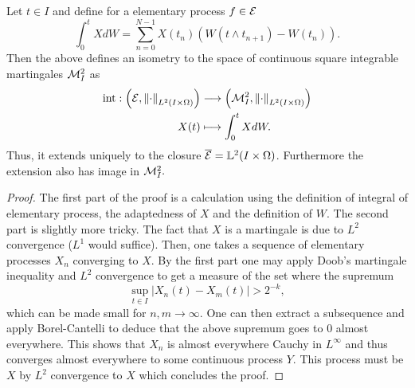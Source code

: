 \documentclass[
    a4paper,
    DIV=14,
    abstract=true,
    numbers=noenddot
]{scrartcl}
\begin{document}
\begin{theorem}
	Let $t\in I$ and define for a elementary process $f\in\mathcal{E}$ $$\int_{0}^t X dW=\sum_{n=0}^{N-1} X(t_n)(W(t\land t_{n+1})-W(t_n)).$$
	Then the above defines an isometry to the space of continuous square integrable martingales $\mathcal{M}_I^2$ as
	\begin{align*}
		\mathrm{int }: \left(\mathcal{E},\left\lVert \cdot  \right\rVert_ {L^2(I\times\Omega)}\right) & \longrightarrow  \left(\mathcal{M}_ I^2,\left\lVert \cdot  \right\rVert_{L^2(I\times\Omega)}\right) \\
		X(t)                                                           & \longmapsto \int_ {0}^t X dW
		.\end{align*}
	Thus, it extends uniquely to the closure $\overline{\mathcal{E}}=\mathbb{L}^2(I\times\Omega)$. Furthermore the extension also has image in $\mathcal{M}_I^2.$
\end{theorem}
\begin{proof}
	The first part of the proof is a calculation using the definition of integral of elementary process, the adaptedness of $X$ and the definition of  $W$. The second part is slightly more tricky. The fact that $X$ is a martingale is due to  $L^2$ convergence ($L^1$ would suffice). Then, one takes a sequence of elementary processes  $X_n$ converging to  $X$. By the first part one may apply Doob's martingale inequality and $L^2$ convergence to get a measure of the set where the supremum
	\begin{equation*}
		\sup_{t\in I}  |X_n(t)-X_m(t)|>2^{-k},
	\end{equation*}
	which can be made small for $n,m \to\infty$. One can then extract a subsequence and apply Borel-Cantelli to deduce that the above supremum goes to $0$ almost everywhere. This shows that  $X_n$ is almost everywhere Cauchy in  $L^\infty$ and thus converges almost everywhere to some continuous process $Y$. This process must be $X$ by  $L^2$ convergence to  $X$ which concludes the proof.
\end{proof}



\end{document}
